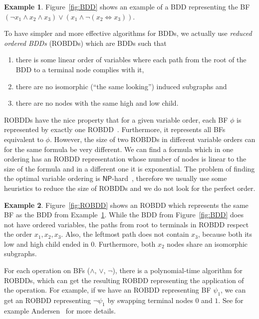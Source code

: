 \documentclass[
  digital, %
  color,
  twoside, %
  table,   %
  nolof,     %
  nolot,     %
]{fithesis3}
\theoremstyle{definition}
\newtheorem{example}{Example}
\theoremstyle{remark}
\newcommand{\lequal}{\Leftrightarrow}
\newcommand{\ComplexityFont}[1]{\mathsf{#1}}
\newcommand{\NP}{\ComplexityFont{NP}}
\begin{document}
\begin{example}
\label{ex:BDD}
Figure~\ref{fig:BDD} shows an example of a BDD representing the BF $(\neg x_1 \land x_2 \land x_3) \lor (x_1 \land \neg (x_2 \lequal x_3))$. 
\end{example}

To have simpler and more effective algorithms for BDDs, we actually use \emph{reduced ordered BDDs} (ROBDDs) which are BDDs such that 
\begin{enumerate}
    \item there is some linear order of variables where each path from the root of the BDD to a terminal node complies with it,
    \item there are no isomorphic (``the same looking'') induced subgraphs and
    \item there are no nodes with the same high and low child.
\end{enumerate}
ROBDDs have the nice property that for a given variable order, each BF $\phi$ is represented by exactly one ROBDD~\cite{BDD}. Furthermore, it represents all BFs equivalent to $\phi$. However, the size of two ROBDDs in different variable orders can for the same formula be very different. We can find a formula which in one ordering has an ROBDD representation whose number of nodes is linear to the size of the formula and in a different one it is exponential. The problem of finding the optimal variable ordering is $\NP$-hard~\cite{BDDoptimalorderisNP}, therefore we usually use some heuristics to reduce the size of ROBDDs and we do not look for the perfect order.

\begin{example}
\label{ex:ROBDD}
Figure~\ref{fig:ROBDD} shows an ROBDD which represents the same BF as the BDD from Example~\ref{ex:BDD}. While the BDD from Figure~\ref{fig:BDD} does not have ordered variables, the paths from root to terminals in ROBDD respect the order $x_1,x_2,x_3$. Also, the leftmost path does not contain $x_3$, because both its low and high child ended in $0$. Furthermore, both $x_2$ nodes share an isomorphic subgraphs.
\end{example}

For each operation on BFs (${\land}$, ${\lor}$, ${\neg}$), there is a polynomial-time algorithm for ROBDDs, which can get the resulting ROBDD representing the application of the operation. For example, if we have an ROBDD representing BF $\psi_1$, we can get an ROBDD representing $\neg \psi_1$ by swapping terminal nodes $0$ and $1$. See for example Andersen~\cite{BDDdetails} for more details.
\end{document}
